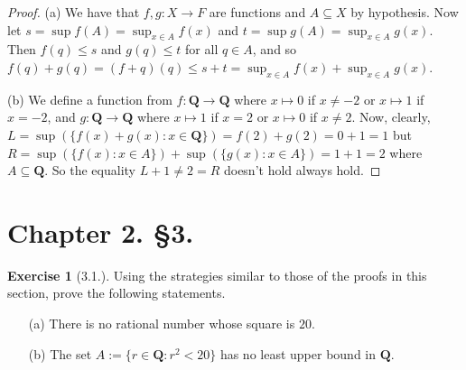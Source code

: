 \documentclass[9pt,reqno]{amsart}
\theoremstyle{definition}
\newtheorem{exercise}{Exercise}[section]
\newcommand{\qq}{\mathbf Q}
\begin{document}
\begin{proof}
	(a) We have that $f, g \colon X \to F$ are functions and $A \subseteq X$ by hypothesis. Now let $s = \sup f(A)= \sup_{x \in A} f(x)$ and $t = \sup g(A) = \sup_{x \in A} g(x)$. Then $f(q) \leq s$ and $g(q) \leq t$ for all $q \in A$, and so $f(q) + g(q) = (f+q)(q) \leq s + t = \sup _{x \in A} f(x) + \sup _{x \in A} g(x)$.
	
	(b) We define a function from $f \colon \qq \to \qq $ where $x \mapsto 0$ if $x \neq -2$ or $x \mapsto 1$ if $x = -2$, and $g \colon \qq \to \qq$ where $x \mapsto 1$ if $x=2$ or $x \mapsto 0$ if $x \neq 2$. Now, clearly, $L = \sup (\{f(x) + g(x) \colon x \in \qq \}) = f(2) + g(2) = 0+1 = 1$ but  $R = \sup (\{ f(x) \colon x \in A \}) + \sup (\{ g(x) \colon x \in A \}) = 1+1 = 2$ where $A \subseteq \qq$. So the equality $L + 1 \neq 2 = R$ doesn't hold always hold. 
\end{proof}
\section*{Chapter 2. \S 3.}
\begin{exercise}[3.1.] Using the strategies similar to those of the proofs in this section, prove the following statements.
\begin{itemize}
	\item [(a)] There is no rational number whose square is $20$.
	\item [(b)] The set $A:=\{r\in \qq \colon r^2 < 20 \}$ has no least upper bound in $\qq$.
\end{itemize}
\end{exercise}
\end{document}
